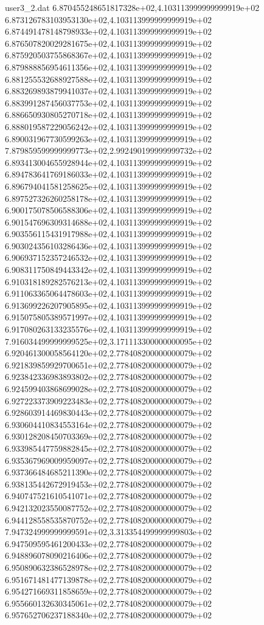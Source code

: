 \begin{filecontents}{user3_2.dat}
6.870455248651817328e+02,4.103113999999999919e+02
6.873126783103953130e+02,4.103113999999999919e+02
6.874491478148798933e+02,4.103113999999999919e+02
6.876507820029281675e+02,4.103113999999999919e+02
6.875920503755868367e+02,4.103113999999999919e+02
6.879888856954611356e+02,4.103113999999999919e+02
6.881255532688927588e+02,4.103113999999999919e+02
6.883269893879941037e+02,4.103113999999999919e+02
6.883991287456037753e+02,4.103113999999999919e+02
6.886650930805270718e+02,4.103113999999999919e+02
6.888019587229056242e+02,4.103113999999999919e+02
6.890031967730599263e+02,4.103113999999999919e+02
7.879859599999999773e+02,2.992490199999999732e+02
6.893413004655928944e+02,4.103113999999999919e+02
6.894783641769186033e+02,4.103113999999999919e+02
6.896794041581258625e+02,4.103113999999999919e+02
6.897527326260258178e+02,4.103113999999999919e+02
6.900175078506588306e+02,4.103113999999999919e+02
6.901547696309314688e+02,4.103113999999999919e+02
6.903556115431917988e+02,4.103113999999999919e+02
6.903024356103286436e+02,4.103113999999999919e+02
6.906937152357246532e+02,4.103113999999999919e+02
6.908311750849443342e+02,4.103113999999999919e+02
6.910318189282576213e+02,4.103113999999999919e+02
6.911063365064478603e+02,4.103113999999999919e+02
6.913699226207905895e+02,4.103113999999999919e+02
6.915075805389571997e+02,4.103113999999999919e+02
6.917080263133235576e+02,4.103113999999999919e+02
7.916034499999999525e+02,3.171113300000000095e+02
6.920461300058564120e+02,2.778408200000000079e+02
6.921839859929700651e+02,2.778408200000000079e+02
6.923842336983893802e+02,2.778408200000000079e+02
6.924599403868699028e+02,2.778408200000000079e+02
6.927223373909223483e+02,2.778408200000000079e+02
6.928603914469830443e+02,2.778408200000000079e+02
6.930604410834553164e+02,2.778408200000000079e+02
6.930128208450703369e+02,2.778408200000000079e+02
6.933985447759882845e+02,2.778408200000000079e+02
6.935367969009959097e+02,2.778408200000000079e+02
6.937366484685211390e+02,2.778408200000000079e+02
6.938135442672919453e+02,2.778408200000000079e+02
6.940747521610541071e+02,2.778408200000000079e+02
6.942132023550087752e+02,2.778408200000000079e+02
6.944128558535870752e+02,2.778408200000000079e+02
7.947324999999999591e+02,3.313354499999999803e+02
6.947509595461200433e+02,2.778408200000000079e+02
6.948896078090216406e+02,2.778408200000000079e+02
6.950890632386528978e+02,2.778408200000000079e+02
6.951671481477139878e+02,2.778408200000000079e+02
6.954271669311858659e+02,2.778408200000000079e+02
6.955660132630345061e+02,2.778408200000000079e+02
6.957652706237188340e+02,2.778408200000000079e+02

\end{filecontents}
